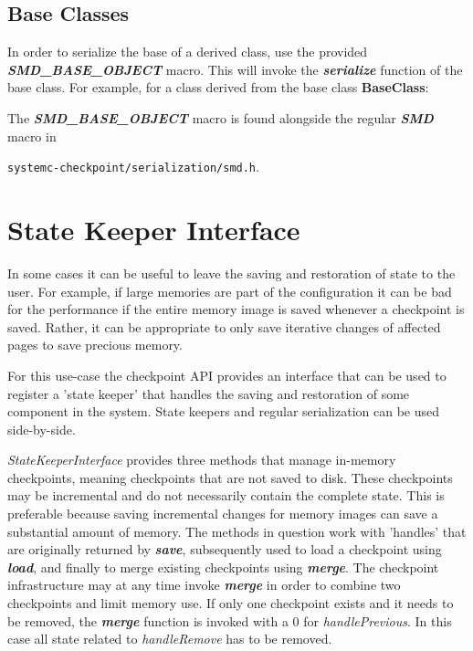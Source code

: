 \documentclass[oneside]{memoir}
\begin{document}
\section{Base Classes}
\label{base-classes}

In order to serialize the base of a derived class, use the provided \textit{\textbf{SMD\_BASE\_OBJECT}} macro.
This will invoke the \textit{\textbf{serialize}} function of the base class.
For example, for a class derived from the base class \textbf{BaseClass}:



The \textit{\textbf{SMD\_BASE\_OBJECT}} macro is found alongside the regular \textit{\textbf{SMD}} macro in

\texttt{systemc-checkpoint/serialization/smd.h}.

\chapter{State Keeper Interface}
\label{state-keeper}

In some cases it can be useful to leave the saving and restoration of state to the user.
For example, if large memories are part of the configuration it can be bad for the performance if the entire memory image is saved whenever a checkpoint is saved.
Rather, it can be appropriate to only save iterative changes of affected pages to save precious memory.

For this use-case the checkpoint API provides an interface that can be used to register a 'state keeper' that handles the saving and restoration of some component in the system.
State keepers and regular serialization can be used side-by-side.



\textit{StateKeeperInterface} provides three methods that manage in-memory checkpoints, meaning checkpoints that are not saved to disk.
These checkpoints may be incremental and do not necessarily contain the complete state.
This is preferable because saving incremental changes for memory images can save a substantial amount of memory.
The methods in question work with 'handles' that are originally returned by \textit{\textbf{save}}, subsequently used to load a checkpoint using \textit{\textbf{load}}, and finally to merge existing checkpoints using \textit{\textbf{merge}}.
The checkpoint infrastructure may at any time invoke \textit{\textbf{merge}} in order to combine two checkpoints and limit memory use.
If only one checkpoint exists and it needs to be removed, the \textit{\textbf{merge}} function is invoked with a 0 for \textit{handlePrevious}.
In this case all state related to \textit{handleRemove} has to be removed.
\end{document}
